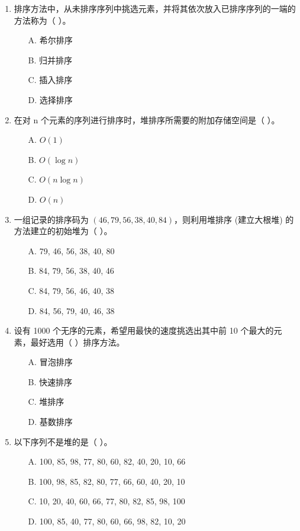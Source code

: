 \documentclass[12pt, a4paper]{article}
\begin{document}
\begin{enumerate}
    \item 排序方法中，从未排序序列中挑选元素，并将其依次放入已排序序列的一端的方法称为（ ）。
    \begin{enumerate}
        \item[A.] 希尔排序
        \item[B.] 归并排序
        \item[C.] 插入排序
        \item[D.] 选择排序
    \end{enumerate}
    
    \item 在对 n 个元素的序列进行排序时，堆排序所需要的附加存储空间是（ ）。
    \begin{enumerate}
        \item[A.] $O(1)$
        \item[B.] $O(\log n)$
        \item[C.] $O(n \log n)$
        \item[D.] $O(n)$
    \end{enumerate}
    
    \item 一组记录的排序码为 $(46, 79, 56, 38, 40, 84)$，则利用堆排序 (建立大根堆) 的方法建立的初始堆为（ ）。
    \begin{enumerate}
        \item[A.] 79, 46, 56, 38, 40, 80
        \item[B.] 84, 79, 56, 38, 40, 46
        \item[C.] 84, 79, 56, 46, 40, 38
        \item[D.] 84, 56, 79, 40, 46, 38
    \end{enumerate}
    
    \item 设有 1000 个无序的元素，希望用最快的速度挑选出其中前 10 个最大的元素，最好选用（ ）排序方法。
    \begin{enumerate}
        \item[A.] 冒泡排序
        \item[B.] 快速排序
        \item[C.] 堆排序
        \item[D.] 基数排序
    \end{enumerate}
    
    \item 以下序列不是堆的是（ ）。
    \begin{enumerate}
        \item[A.] 100, 85, 98, 77, 80, 60, 82, 40, 20, 10, 66
        \item[B.] 100, 98, 85, 82, 80, 77, 66, 60, 40, 20, 10
        \item[C.] 10, 20, 40, 60, 66, 77, 80, 82, 85, 98, 100
        \item[D.] 100, 85, 40, 77, 80, 60, 66, 98, 82, 10, 20
    \end{enumerate}
    

\end{enumerate}
\end{document}
